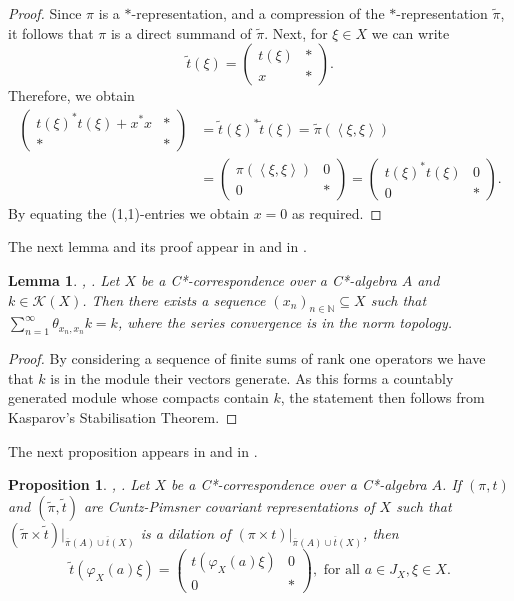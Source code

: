 \documentclass[11pt, draft]{amsart}
\numberwithin{equation}{section}
\theoremstyle{plain}
\newtheorem{proposition}[theorem]{Proposition}
\newtheorem{lemma}[theorem]{Lemma}
\theoremstyle{definition}
\theoremstyle{remark}
\newcommand{\K}{{\mathcal{K}}}
\newcommand\vphi{\varphi}
\newcommand{\bN}{\mathbb{N}}
\newcommand{\foral}{\text{ for all }}
\newcommand{\ol}{\overline}
\newcommand{\wt}{\widetilde}
\newcommand{\sca}[1]{\left\langle#1\right\rangle} %
\begin{document}
\begin{proof}
Since $\pi$ is a $*$-representation, and a compression of the $*$-representation $\wt{\pi}$, it follows that $\pi$ is a direct summand of $\wt{\pi}$.
Next, for $\xi\in X$ we can write 
\[
\wt{t}(\xi)
=
\begin{pmatrix}
t(\xi) & \ast \\
x & \ast
\end{pmatrix}.
\]
Therefore, we obtain
\begin{align*}
\begin{pmatrix}
t(\xi)^*t(\xi)+x^*x & \ast \\
\ast & \ast
\end{pmatrix}
&=
\wt{t}(\xi)^*\wt{t}(\xi)=\wt{\pi}(\sca{\xi,\xi})\\
&=
\begin{pmatrix}
\pi(\sca{\xi,\xi})& 0 \\
0 & \ast
\end{pmatrix}
=
\begin{pmatrix}
t(\xi)^* t(\xi) & 0 \\ 0 & \ast
\end{pmatrix}.
\end{align*}
By equating the (1,1)-entries we obtain $x=0$ as required.
\end{proof}

The next lemma and its proof appear in \cite[proof of Theorem 3.1]{KR20} and in \cite[Lemma 3.3]{Kim21}.

\begin{lemma}\label{L:Kasparov} \cite[proof of Theorem 3.1]{KR20}, \cite[Lemma 3.3]{Kim21}.
Let $X$ be a C*-correspondence over a C*-algebra $A$ and $k\in \K(X)$. 
Then there exists a sequence $(x_n)_{n\in\bN} \subseteq X$ such that $\sum_{n=1}^{\infty}\theta_{x_n,x_n} k = k$, where the series convergence is in the norm topology.
\end{lemma}

\begin{proof}
By considering a sequence of finite sums of rank one operators we have that $k$ is in the module their vectors generate. 
As this forms a countably generated module whose compacts contain $k$, the statement then follows from Kasparov's Stabilisation Theorem.
\end{proof}

The next proposition appears in \cite[proof of Theorem 3.1]{KR21} and in \cite[proof of Theorem 3.5]{Kim21}.

\begin{proposition}\label{P:J part} \cite[proof of Theorem 3.1]{KR21}, \cite[proof of Theorem 3.5]{Kim21}.
Let $X$ be a C*-correspondence over a C*-algebra $A$. 
If $(\pi,t)$ and $\left(\wt{\pi},\wt{t}\right)$ are Cuntz-Pimsner covariant representations of $X$ such that $(\wt{\pi}\times\wt{t})|_{\ol{\pi}(A) \cup \ol{t}(X)}$ is a dilation of $(\pi\times t)|_{\ol{\pi}(A) \cup \ol{t}(X)}$, then 
\[
\wt{t}(\vphi_X(a)\xi)=
\begin{pmatrix}
t(\vphi_X(a)\xi) & 0 \\
0 & *
\end{pmatrix}, \foral a\in J_X , \xi\in X.
\]
\end{proposition}
\end{document}
